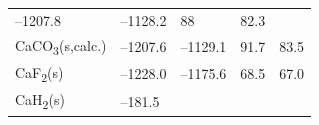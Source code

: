 \documentclass[
  9pt,
]{extbook}
\theoremstyle{definition}
\theoremstyle{definition}
\theoremstyle{definition}
\theoremstyle{remark}
\begin{document}
\begin{longtable}[]{@{}lllll@{}}
\begin{minipage}[t]{0.19\columnwidth}
--1207.8\strut
\end{minipage} & \begin{minipage}[t]{0.20\columnwidth}\raggedright
--1128.2\strut
\end{minipage} & \begin{minipage}[t]{0.18\columnwidth}\raggedright
88\strut
\end{minipage} & \begin{minipage}[t]{0.18\columnwidth}\raggedright
82.3\strut
\end{minipage}\tabularnewline
\begin{minipage}[t]{0.10\columnwidth}\raggedright
CaCO\textsubscript{3}(s,calc.)\strut
\end{minipage} & \begin{minipage}[t]{0.19\columnwidth}\raggedright
--1207.6\strut
\end{minipage} & \begin{minipage}[t]{0.20\columnwidth}\raggedright
--1129.1\strut
\end{minipage} & \begin{minipage}[t]{0.18\columnwidth}\raggedright
91.7\strut
\end{minipage} & \begin{minipage}[t]{0.18\columnwidth}\raggedright
83.5\strut
\end{minipage}\tabularnewline
\begin{minipage}[t]{0.10\columnwidth}\raggedright
CaF\textsubscript{2}(s)\strut
\end{minipage} & \begin{minipage}[t]{0.19\columnwidth}\raggedright
--1228.0\strut
\end{minipage} & \begin{minipage}[t]{0.20\columnwidth}\raggedright
--1175.6\strut
\end{minipage} & \begin{minipage}[t]{0.18\columnwidth}\raggedright
68.5\strut
\end{minipage} & \begin{minipage}[t]{0.18\columnwidth}\raggedright
67.0\strut
\end{minipage}\tabularnewline
\begin{minipage}[t]{0.10\columnwidth}\raggedright
CaH\textsubscript{2}(s)\strut
\end{minipage} & \begin{minipage}[t]{0.19\columnwidth}\raggedright
--181.5\strut
\end{minipage} & \begin{minipage}[t]{0.20\columnwidth}\raggedright

\end{minipage}
\end{longtable}
\end{document}
